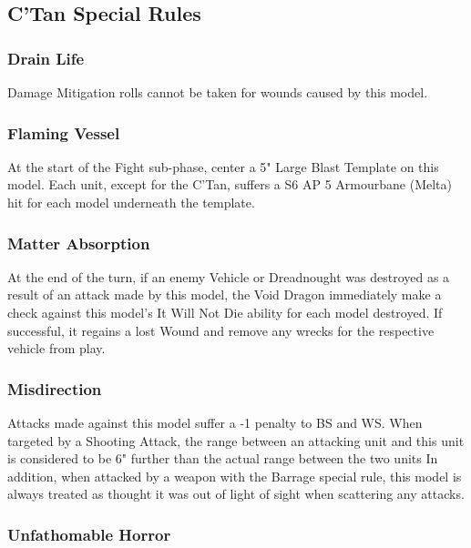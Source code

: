 \subsection{C'Tan Special Rules}

\subsubsection{Drain Life} \label{Drain Life}

Damage Mitigation rolls cannot be taken for wounds caused by this model.

\subsubsection{Flaming Vessel} \label{Flaming Vessel}

At the start of the Fight sub-phase, center a 5" Large Blast Template on this model. Each unit, except for the C'Tan, suffers a S6 AP 5 Armourbane (Melta) hit for each model underneath the template.
 
\subsubsection{Matter Absorption} \label{Matter Absorption}

At the end of the turn, if an enemy Vehicle or Dreadnought was destroyed as a result of an attack made by this model, the Void Dragon immediately make a check against this model's It Will Not Die ability for each model destroyed. If successful, it regains a lost Wound and remove any wrecks for the respective vehicle from play.

\subsubsection{Misdirection} \label{Misdirection}

Attacks made against this model suffer a -1 penalty to BS and WS. When targeted by a Shooting Attack, the range between an attacking unit and this unit is considered to be 6" further than the actual range between the two units In addition, when attacked by a weapon with the Barrage special rule, this model is always treated as thought it was out of light of sight when scattering any attacks.

\subsubsection{Unfathomable Horror} \label{Unfathomable Horror}

